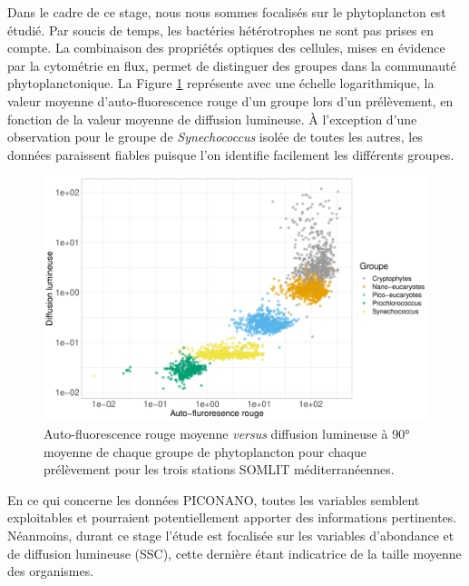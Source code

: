 \documentclass[12pt]{article}
\begin{document}
Dans le cadre de ce stage, nous nous sommes focalisés sur le phytoplancton est étudié. Par soucis de temps, les bactéries hétérotrophes ne sont pas prises en compte. 
La combinaison des propriétés optiques des cellules, mises en évidence par la cytométrie en flux, permet de distinguer des groupes dans la communauté phytoplanctonique. %
La Figure \ref{vis_cyto} représente avec une échelle logarithmique, la valeur moyenne d’auto-fluorescence rouge d’un groupe lors d’un prélèvement, en fonction de la valeur moyenne de diffusion lumineuse. À l’exception d’une observation pour le groupe de \textit{Synechococcus} isolée de toutes les autres, les données paraissent fiables puisque l'on identifie facilement les différents groupes. 

\begin{figure}
\centering
\includegraphics[width=.75\textwidth]{fig/MM_visualisation_phyto.pdf}
\caption{Auto-fluorescence rouge moyenne \textit{versus} diffusion lumineuse à 90° moyenne de chaque groupe de phytoplancton pour chaque prélèvement pour les trois stations SOMLIT méditerranéennes. }
\label{vis_cyto}
\end{figure}

En ce qui concerne les données PICONANO, toutes les variables semblent exploitables et pourraient potentiellement apporter des informations pertinentes. Néanmoins, durant ce stage l’étude est focalisée sur les variables d’abondance et de diffusion lumineuse (SSC), cette dernière étant indicatrice de la taille moyenne des organismes. 
\end{document}
